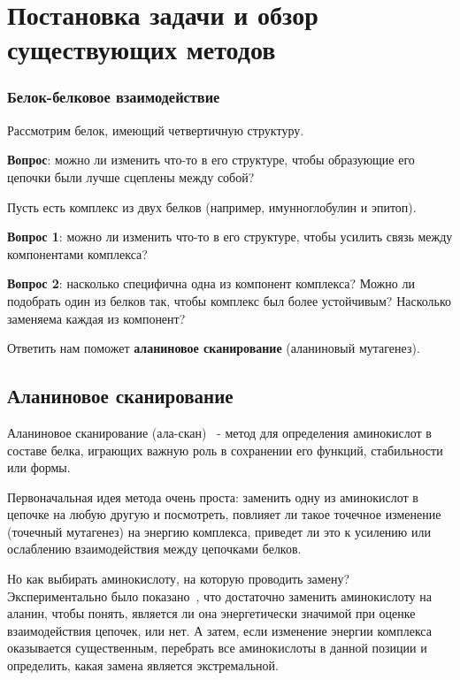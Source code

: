 \chapter{Постановка задачи и обзор существующих методов}
\subsection{Белок-белковое взаимодействие}
Рассмотрим белок, имеющий четвертичную структуру.

\textbf{Вопрос}: можно ли изменить что-то в его структуре, чтобы образующие его цепочки были лучше сцеплены между собой?

Пусть есть комплекс из двух белков (например, имунноглобулин и эпитоп).

\textbf{Вопрос 1}: можно ли изменить что-то в его структуре, чтобы усилить связь между компонентами комплекса?

\textbf{Вопрос 2}: насколько специфична одна из компонент комплекса?  Можно ли подобрать один из белков так, чтобы комплекс был более устойчивым? Насколько заменяема каждая из компонент?

Ответить нам поможет \textbf{аланиновое сканирование} (аланиновый мутагенез).
\section{Аланиновое сканирование}
Аланиновое сканирование (ала-скан)~\cite{alascan2001} - метод для определения аминокислот в составе белка, играющих важную роль в сохранении его функций, стабильности или формы.

Первоначальная идея метода очень проста: заменить одну из аминокислот в цепочке на любую другую и посмотреть, повлияет ли такое точечное изменение (точечный мутагенез) на энергию комплекса, приведет ли это к усилению или ослаблению взаимодействия между цепочками белков. 

Но как выбирать аминокислоту, на которую проводить замену? Экспериментально было показано~\cite{alascan2001}, что достаточно заменить аминокислоту на аланин, чтобы понять, является ли она энергетически значимой при оценке взаимодействия цепочек, или нет. А затем, если изменение энергии комплекса \ddG оказывается существенным, перебрать все аминокислоты в данной позиции и определить, какая замена является экстремальной.

